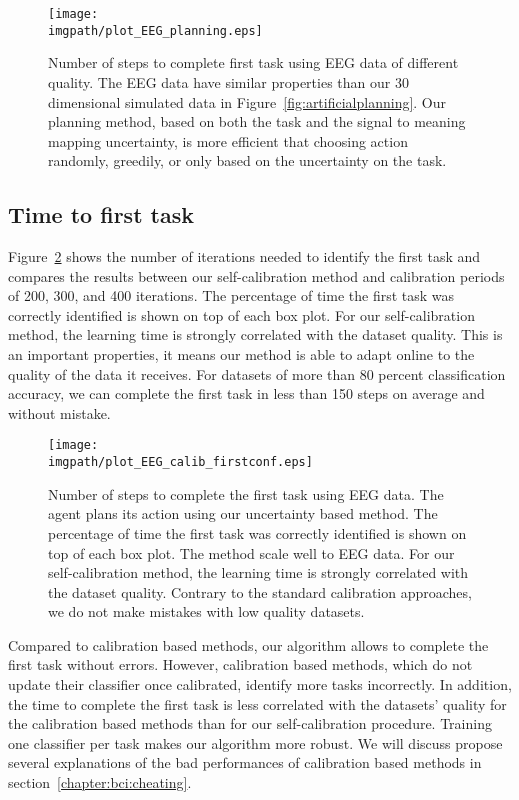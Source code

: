 \begin{figure}[!htbp]
    \centering
    \texttt{[image: \\imgpath/plot\_EEG\_planning.eps]}
    \caption{Number of steps to complete first task using EEG data of different quality. The EEG data have similar properties than our 30 dimensional simulated data in Figure~\ref{fig:artificialplanning}. Our planning method, based on both the task and the signal to meaning mapping uncertainty, is more efficient that choosing action randomly, greedily, or only based on the uncertainty on the task.}
    \label{fig:planningEEG}
\end{figure}

\subsection{Time to first task}

Figure~\ref{fig:firstEEG} shows the number of iterations needed to identify the first task and compares the results between our self-calibration method and calibration periods of 200, 300, and 400 iterations. The percentage of time the first task was correctly identified is shown on top of each box plot. For our self-calibration method, the learning time is strongly correlated with the dataset quality. This is an important properties, it means our method is able to adapt online to the quality of the data it receives. For datasets of more than 80 percent classification accuracy, we can complete the first task in less than 150 steps on average and without mistake.

\begin{figure}[!htbp]
\centering
\texttt{[image: \\imgpath/plot\_EEG\_calib\_firstconf.eps]}
\caption{Number of steps to complete the first task using EEG data. The agent plans its action using our uncertainty based method. The percentage of time the first task was correctly identified is shown on top of each box plot. The method scale well to EEG data. For our self-calibration method, the learning time is strongly correlated with the dataset quality. Contrary to the standard calibration approaches, we do not make mistakes with low quality datasets.}
\label{fig:firstEEG}
\end{figure}

Compared to calibration based methods, our algorithm allows to complete the first task without errors. However, calibration based methods, which do not update their classifier once calibrated, identify more tasks incorrectly. In addition, the time to complete the first task is less correlated with the datasets' quality for the calibration based methods than for our self-calibration procedure. Training one classifier per task makes our algorithm more robust. We will discuss propose several explanations of the bad performances of calibration based methods in section~\ref{chapter:bci:cheating}.

